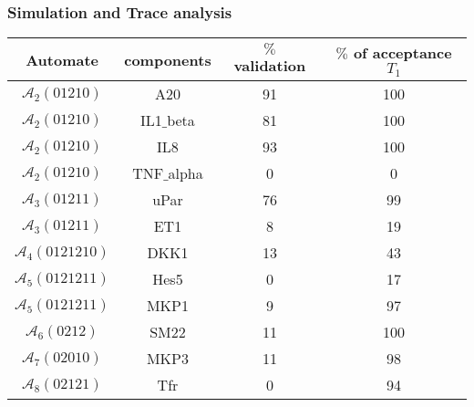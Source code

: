\begin{frame}
\frametitle{Simulation and Trace analysis}
\begin{tabular}{|c|c||c|c|}
\hline

\textbf{Automate} & \textbf{components} & \textbf{$\%$  validation} & \textbf{$\%$ of acceptance $T_{1}$}
\\ \hline

$\mathcal{A}_{2}(01210)$ & A20 & 91 & 100 
\\ \hline

$\mathcal{A}_{2}(01210)$ & IL1$\_$beta & 81 & 100
\\ \hline

$\mathcal{A}_{2}(01210)$ & IL8 & 93 & 100 
\\ \hline

$\mathcal{A}_{2}(01210)$ & TNF$\_$alpha & 0 & 0
\\ \hline

$\mathcal{A}_{3}(01211)$ & uPar & 76 & 99 
\\ \hline

$\mathcal{A}_{3}(01211)$ & ET1 & 8 & 19 
\\ \hline

$\mathcal{A}_{4}(0121210)$ & DKK1 & 13 & 43

\\ \hline

$\mathcal{A}_{5}(0121211)$ & Hes5 & 0 & 17 
\\ \hline

$\mathcal{A}_{5}(0121211)$ & MKP1 & 9 & 97
\\ \hline

$\mathcal{A}_{6}(0212)$ & SM22 & 11 & 100 
\\ \hline

$\mathcal{A}_{7}(02010)$ & MKP3 & 11 & 98

\\ \hline

$\mathcal{A}_{8}(02121)$ & Tfr & 0 & 94 
\\ \hline

\end{tabular}

\end{frame}



